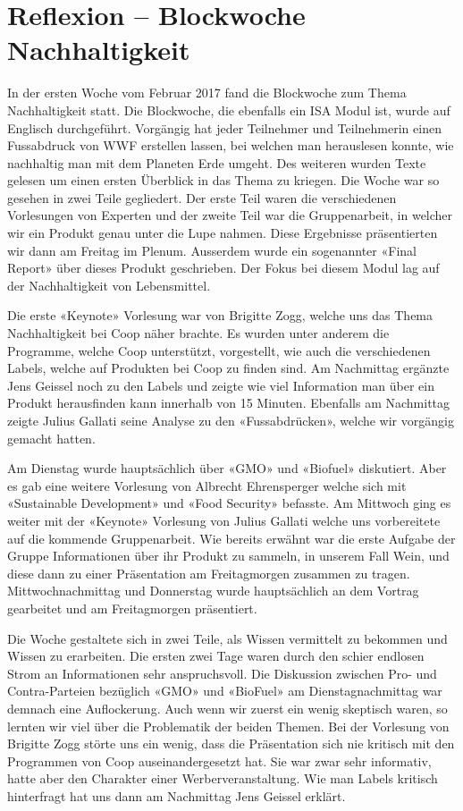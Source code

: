 \section{Reflexion – Blockwoche Nachhaltigkeit }
In der ersten Woche vom Februar 2017 fand die Blockwoche zum Thema Nachhaltigkeit statt. Die
Blockwoche, die ebenfalls ein ISA Modul ist, wurde auf Englisch durchgeführt. Vorgängig hat jeder
Teilnehmer und Teilnehmerin einen Fussabdruck von WWF erstellen lassen, bei welchen man herauslesen
konnte,  wie nachhaltig man mit dem Planeten Erde umgeht. Des weiteren wurden Texte gelesen um einen
ersten Überblick in das Thema zu kriegen. Die Woche war so gesehen in zwei Teile gegliedert. Der
erste Teil waren die verschiedenen Vorlesungen von Experten und der zweite Teil war die
Gruppenarbeit, in welcher wir ein Produkt genau unter die Lupe nahmen. Diese Ergebnisse
präsentierten wir dann am Freitag im Plenum. Ausserdem wurde ein sogenannter «Final Report» über
dieses Produkt geschrieben. Der Fokus bei diesem Modul lag auf der Nachhaltigkeit von Lebensmittel. 

Die erste «Keynote» Vorlesung war von Brigitte Zogg, welche uns das Thema Nachhaltigkeit bei Coop
näher brachte. Es wurden unter anderem die Programme,  welche Coop unterstützt, vorgestellt, wie
auch die verschiedenen Labels, welche auf Produkten bei Coop zu finden sind. Am Nachmittag ergänzte
Jens Geissel noch zu den Labels und zeigte wie viel Information man über ein Produkt herausfinden
kann innerhalb von 15 Minuten. Ebenfalls am Nachmittag zeigte Julius Gallati seine Analyse zu den
«Fussabdrücken»,  welche wir vorgängig gemacht hatten. 

Am Dienstag wurde hauptsächlich über «GMO» und «Biofuel» diskutiert. Aber es gab eine weitere Vorlesung von Albrecht Ehrensperger welche sich mit «Sustainable Development» und «Food Security» befasste. 
Am Mittwoch ging es weiter mit der «Keynote» Vorlesung von Julius Gallati welche uns vorbereitete auf die kommende Gruppenarbeit. Wie bereits erwähnt war die erste Aufgabe der Gruppe Informationen über ihr Produkt zu sammeln, in unserem Fall Wein, und diese dann zu einer Präsentation am Freitagmorgen zusammen zu tragen. Mittwochnachmittag und Donnerstag wurde hauptsächlich an dem Vortrag gearbeitet und am Freitagmorgen präsentiert. 

Die Woche gestaltete sich in zwei Teile, als Wissen vermittelt zu bekommen und Wissen zu erarbeiten.
Die ersten zwei Tage waren durch den schier endlosen Strom an Informationen sehr anspruchsvoll. Die
Diskussion zwischen Pro- und Contra-Parteien bezüglich «GMO» und «BioFuel» am Dienstagnachmittag war
demnach eine Auflockerung. Auch wenn wir zuerst ein wenig skeptisch waren, so lernten wir viel über
die Problematik der beiden Themen. Bei der Vorlesung von Brigitte Zogg störte uns ein wenig, dass
die Präsentation sich nie kritisch mit den Programmen von Coop auseinandergesetzt hat. Sie war zwar
sehr informativ, hatte aber den Charakter einer Werberveranstaltung.  Wie man Labels kritisch
hinterfragt hat uns dann am Nachmittag Jens Geissel erklärt.

